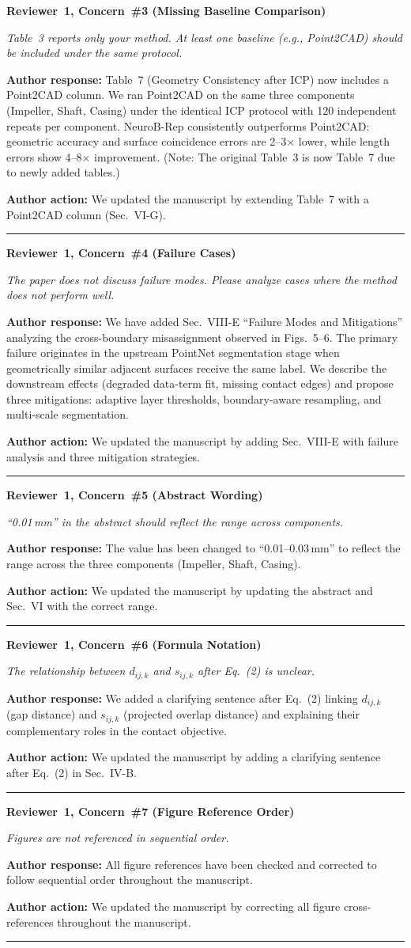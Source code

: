 \documentclass[11pt]{article}
\newcommand{\concern}[2]{\noindent\textbf{Reviewer~#1, Concern~\##2}\par}
\newcommand{\concerntext}[1]{\noindent\textit{#1}\par\medskip}
\newcommand{\authorresponse}[1]{\noindent\textbf{Author response:} #1\par\medskip}
\newcommand{\authoraction}[1]{\noindent\textbf{Author action:} We updated the manuscript by #1\par\bigskip\noindent\rule{\linewidth}{0.4pt}\par\medskip}
\begin{document}
\concern{1}{3 (Missing Baseline Comparison)}
\concerntext{Table~3 reports only your method. At least one baseline (e.g.,
Point2CAD) should be included under the same protocol.}
\authorresponse{Table~7 (Geometry Consistency after ICP) now includes a
Point2CAD column. We ran Point2CAD on the same three components
(Impeller, Shaft, Casing) under the identical ICP protocol
with 120 independent repeats per component.
NeuroB-Rep consistently outperforms Point2CAD: geometric accuracy
and surface coincidence errors are 2--3$\times$ lower, while length
errors show 4--8$\times$ improvement.
(Note: The original Table~3 is now Table~7 due to newly added tables.)}
\authoraction{extending Table~7 with a Point2CAD column (Sec.~VI-G).}

\concern{1}{4 (Failure Cases)}
\concerntext{The paper does not discuss failure modes. Please analyze cases
where the method does not perform well.}
\authorresponse{We have added Sec.~VIII-E ``Failure Modes and Mitigations''
analyzing the cross-boundary misassignment observed in
Figs.~5--6. The primary failure originates in the upstream
PointNet segmentation stage when geometrically similar adjacent
surfaces receive the same label. We describe the downstream
effects (degraded data-term fit, missing contact edges) and
propose three mitigations: adaptive layer thresholds,
boundary-aware resampling, and multi-scale segmentation.}
\authoraction{adding Sec.~VIII-E with failure analysis and three mitigation
strategies.}

\concern{1}{5 (Abstract Wording)}
\concerntext{``0.01\,mm'' in the abstract should reflect the range across
components.}
\authorresponse{The value has been changed to ``0.01--0.03\,mm'' to reflect
the range across the three components (Impeller, Shaft, Casing).}
\authoraction{updating the abstract and Sec.~VI with the correct range.}

\concern{1}{6 (Formula Notation)}
\concerntext{The relationship between $d_{ij,k}$ and $s_{ij,k}$ after Eq.~(2)
is unclear.}
\authorresponse{We added a clarifying sentence after Eq.~(2) linking
$d_{ij,k}$ (gap distance) and $s_{ij,k}$ (projected overlap
distance) and explaining their complementary roles in the
contact objective.}
\authoraction{adding a clarifying sentence after Eq.~(2) in Sec.~IV-B.}

\concern{1}{7 (Figure Reference Order)}
\concerntext{Figures are not referenced in sequential order.}
\authorresponse{All figure references have been checked and corrected to
follow sequential order throughout the manuscript.}
\authoraction{correcting all figure cross-references throughout the manuscript.}
\end{document}
